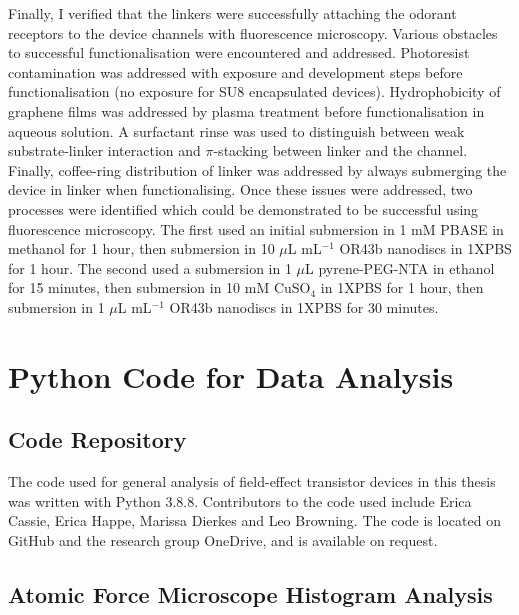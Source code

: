 \documentclass[
  a4paper,
]{scrbook}
\begin{document}
Finally, I verified that the linkers were successfully attaching the
odorant receptors to the device channels with fluorescence microscopy.
Various obstacles to successful functionalisation were encountered and
addressed. Photoresist contamination was addressed with exposure and
development steps before functionalisation (no exposure for SU8
encapsulated devices). Hydrophobicity of graphene films was addressed by
plasma treatment before functionalisation in aqueous solution. A
surfactant rinse was used to distinguish between weak substrate-linker
interaction and \(\pi\)-stacking between linker and the channel.
Finally, coffee-ring distribution of linker was addressed by always
submerging the device in linker when functionalising. Once these issues
were addressed, two processes were identified which could be
demonstrated to be successful using fluorescence microscopy. The first
used an initial submersion in 1 mM PBASE in methanol for 1 hour, then
submersion in 10 \(\mu\)L mL\(^{-1}\) OR43b nanodiscs in 1XPBS for 1
hour. The second used a submersion in 1 \(\mu\)L pyrene-PEG-NTA in
ethanol for 15 minutes, then submersion in 10 mM CuSO\(_4\) in 1XPBS for
1 hour, then submersion in 1 \(\mu\)L mL\(^{-1}\) OR43b nanodiscs in
1XPBS for 30 minutes.

\cleardoublepage
{}
{}
\appendix

\hypertarget{sec-python}{%
\chapter{Python Code for Data Analysis}\label{sec-python}}

\hypertarget{code-repository}{%
\section{Code Repository}\label{code-repository}}

The code used for general analysis of field-effect transistor devices in
this thesis was written with Python 3.8.8. Contributors to the code used
include Erica Cassie, Erica Happe, Marissa Dierkes and Leo Browning. The
code is located on GitHub and the research group OneDrive, and is
available on request.

\hypertarget{sec-histogram-analysis}{%
\section{Atomic Force Microscope Histogram
Analysis}\label{sec-histogram-analysis}}
\end{document}
